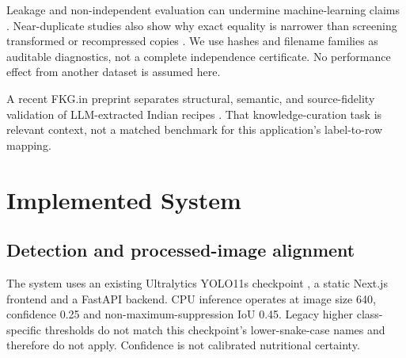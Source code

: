 \documentclass[conference]{IEEEtran}
\begin{document}
Leakage and non-independent evaluation can undermine machine-learning claims \cite{kapoor2023leakage}. Near-duplicate studies also show why exact equality is narrower than screening transformed or recompressed copies \cite{barz2020duplicates}. We use hashes and filename families as auditable diagnostics, not a complete independence certificate. No performance effect from another dataset is assumed here.

A recent FKG.in preprint separates structural, semantic, and source-fidelity validation of LLM-extracted Indian recipes \cite{gupta2026validatingfkg}. That knowledge-curation task is relevant context, not a matched benchmark for this application's label-to-row mapping.

\section{Implemented System}
\subsection{Detection and processed-image alignment}
The system uses an existing Ultralytics YOLO11s checkpoint \cite{ultralytics2024}, a static Next.js frontend and a FastAPI backend. CPU inference operates at image size 640, confidence 0.25 and non-maximum-suppression IoU 0.45. Legacy higher class-specific thresholds do not match this checkpoint's lower-snake-case names and therefore do not apply. Confidence is not calibrated nutritional certainty.
\end{document}
